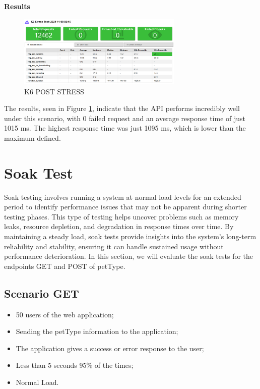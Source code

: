 \documentclass[a4paper,11pt,openright,BCOR=15mm]{scrbook}
\begin{document}
		
		\textbf{Results}

		\begin{figure}[H]
			\centering
			\includegraphics[width=0.7\textwidth]{figs/Performance/Results/K6 POST STRESS.png}
			\caption{K6 POST STRESS}
			\label{fig:K6-POST-STRESS}
		\end{figure}
		The results, seen in Figure \ref{fig:K6-POST-STRESS}, indicate that the API performs incredibly well under this scenario, with 0 failed request and an average response time of just 1015 ms. The highest response time was just 1095 ms, which is lower than the maximum defined.


\section{Soak Test}
		
Soak testing involves running a system at normal load levels for an extended period to identify performance issues that may not be apparent during shorter testing phases. This type of testing helps uncover problems such as memory leaks, resource depletion, and degradation in response times over time. By maintaining a steady load, soak tests provide insights into the system’s long-term reliability and stability, ensuring it can handle sustained usage without performance deterioration. In this section, we will evaluate the soak tests for the endpoints GET and POST of petType.		
		\subsection{Scenario GET}
		\begin{itemize}
			\item 50 users of the web application;
			\item Sending the petType information to the application;
			\item The application gives a success or error response to the user;
			\item Less than 5 seconds 95\% of the times;
			\item Normal Load.
		\end{itemize}
\end{document}
